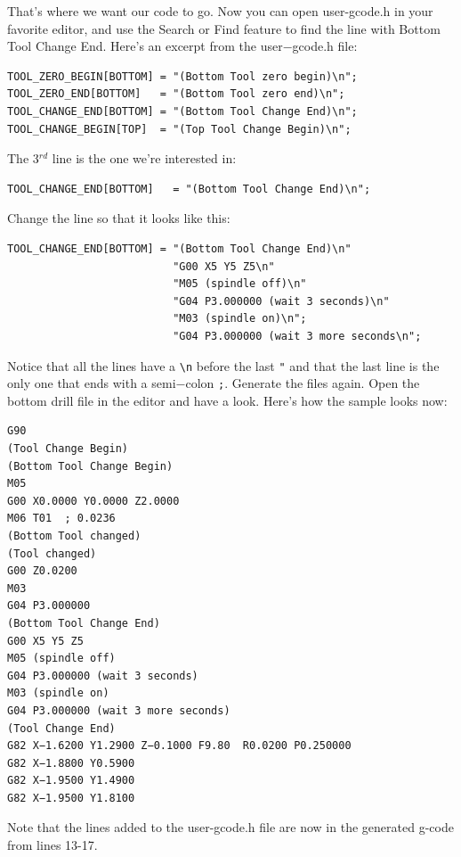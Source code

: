 \documentclass[11pt]{book}
\begin{document}
That's where we want our code to go. Now you can open user-gcode.h in your favorite editor, and use the Search or Find feature to find the line with Bottom Tool Change End. Here's an excerpt from the user−gcode.h file:

\begin{lstlisting}
TOOL_ZERO_BEGIN[BOTTOM]	= "(Bottom Tool zero begin)\n";
TOOL_ZERO_END[BOTTOM]	= "(Bottom Tool zero end)\n";
TOOL_CHANGE_END[BOTTOM]	= "(Bottom Tool Change End)\n";
TOOL_CHANGE_BEGIN[TOP]	= "(Top Tool Change Begin)\n";
\end{lstlisting}
The 3$^{rd}$ line is the one we're interested in:
\begin{lstlisting}[firstnumber=3]
TOOL_CHANGE_END[BOTTOM]   = "(Bottom Tool Change End)\n";
\end{lstlisting}
Change the line so that it looks like this:
\begin{lstlisting}[firstnumber=3]
TOOL_CHANGE_END[BOTTOM] = "(Bottom Tool Change End)\n"
                          "G00 X5 Y5 Z5\n"
                          "M05 (spindle off)\n"
                          "G04 P3.000000 (wait 3 seconds)\n"
                          "M03 (spindle on)\n";
                          "G04 P3.000000 (wait 3 more seconds\n";
\end{lstlisting}

Notice that all the lines have a \lstinline!\n! before the last \lstinline!"! and that the last line is the only one that ends with a semi−colon \lstinline!;!.
Generate the files again. Open the bottom drill file in the editor and have a look. Here's how the sample looks now:
\begin{lstlisting}
G90
(Tool Change Begin)
(Bottom Tool Change Begin)
M05
G00 X0.0000 Y0.0000 Z2.0000
M06 T01  ; 0.0236
(Bottom Tool changed)
(Tool changed)
G00 Z0.0200
M03
G04 P3.000000
(Bottom Tool Change End)
G00 X5 Y5 Z5
M05 (spindle off)
G04 P3.000000 (wait 3 seconds)
M03 (spindle on)
G04 P3.000000 (wait 3 more seconds)
(Tool Change End)
G82 X−1.6200 Y1.2900 Z−0.1000 F9.80  R0.0200 P0.250000
G82 X−1.8800 Y0.5900
G82 X−1.9500 Y1.4900
G82 X−1.9500 Y1.8100
\end{lstlisting}
Note that the lines added to the user-gcode.h file are now in the generated g-code from lines 13-17.
\end{document}
